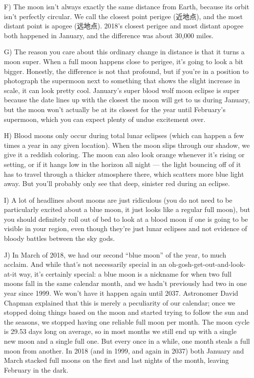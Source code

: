 \documentclass[UTF8,11pt]{ctexart}
\begin{document}
F) The moon isn’t always exactly the same distance from Earth, because its orbit isn’t perfectly circular. We call the closest point perigee (近地点), and the most distant point is apogee (远地点). 2018’s closest perigee and most distant apogee both happened in January, and the difference was about 30,000 miles.


G) The reason you care about this ordinary change in distance is that it turns a moon super. When a full moon happens close to perigee, it’s going to look a bit bigger. Honestly, the difference is not that profound, but if you’re in a position to photograph the supermoon next to something that shows the slight increase in scale, it can look pretty cool. January’s super blood wolf moon eclipse is super because the date lines up with the closest the moon will get to us during January, but the moon won’t actually be at its closest for the year until February’s supermoon, which you can expect plenty of undue excitement over.


H) Blood moons only occur during total lunar eclipses (which can happen a few times a year in any given location). When the moon slips through our shadow, we give it a reddish coloring. The moon can also look orange whenever it’s rising or setting, or if it hangs low in the horizon all night — the light bouncing off of it has to travel through a thicker atmosphere there, which scatters more blue light away. But you’ll probably only see that deep, sinister red during an eclipse.


I) A lot of headlines about moons are just ridiculous (you do not need to be particularly excited about a blue moon, it just looks like a regular full moon), but you should definitely roll out of bed to look at a blood moon if one is going to be visible in your region, even though they’re just lunar eclipses and not evidence of bloody battles between the sky gods.


J) In March of 2018, we had our second “blue moon” of the year, to much acclaim. And while that’s not necessarily special in an oh-gosh-get-out-and-look-at-it way, it’s certainly special: a blue moon is a nickname for when two full moons fall in the same calendar month, and we hadn’t previously had two in one year since 1999. We won’t have it happen again until 2037. Astronomer David Chapman explained that this is merely a peculiarity of our calendar; once we stopped doing things based on the moon and started trying to follow the sun and the seasons, we stopped having one reliable full moon per month. The moon cycle is 29.53 days long on average, so in most months we still end up with a single new moon and a single full one. But every once in a while, one month steals a full moon from another. In 2018 (and in 1999, and again in 2037) both January and March stacked full moons on the first and last nights of the month, leaving February in the dark.
\end{document}
